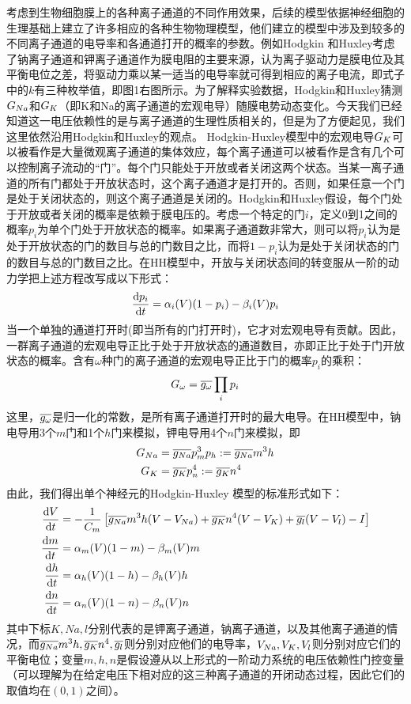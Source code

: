 \documentclass[
pdflinks,
]{xjtuthesis}
\begin{document}
考虑到生物细胞膜上的各种离子通道的不同作用效果，后续的模型依据神经细胞的生理基础上建立了许多相应的各种生物物理模型，他们建立的模型中涉及到较多的不同离子通道的电导率和各通道打开的概率的参数。例如Hodgkin 和Huxley考虑了钠离子通道和钾离子通道作为膜电阻的主要来源，认为离子驱动力是膜电位及其平衡电位之差，将驱动力乘以某一适当的电导率就可得到相应的离子电流，即式子中的$k$有三种枚举值，即图1右图所示。为了解释实验数据，Hodgkin和Huxley猜测$G_{Na}$和$G_{K}$（即K和Na的离子通道的宏观电导）随膜电势动态变化。今天我们已经知道这一电压依赖性的是与离子通道的生理性质相关的，但是为了方便起见，我们这里依然沿用Hodgkin和Huxley的观点。 Hodgkin-Huxley模型中的宏观电导$G_{K}$可以被看作是大量微观离子通道的集体效应，每个离子通道可以被看作是含有几个可以控制离子流动的“门”。每个门只能处于开放或者关闭这两个状态。当某一离子通道的所有门都处于开放状态时，这个离子通道才是打开的。否则，如果任意一个门是处于关闭状态的，则这个离子通道是关闭的。Hodgkin和Huxley假设，每个门处于开放或者关闭的概率是依赖于膜电压的。考虑一个特定的门$i$，定义0到1之间的概率$p_i$为单个门处于开放状态的概率。如果离子通道数非常大，则可以将$p_i$认为是处于开放状态的门的数目与总的门数目之比，而将$1-p_i$认为是处于关闭状态的门的数目与总的门数目之比。在HH模型中，开放与关闭状态间的转变服从一阶的动力学把上述方程改写成以下形式：
\begin{align}
\frac{\mathrm d p_i}{\mathrm d t}= \alpha_i (V)(1-p_i)-\beta_i (V)p_i
\end{align}
当一个单独的通道打开时(即当所有的门打开时)，它才对宏观电导有贡献。因此，一群离子通道的宏观电导正比于处于开放状态的通道数目，亦即正比于处于门开放状态的概率。含有$\omega$种门的离子通道的宏观电导正比于门的概率$p_i$的乘积：
\begin{align}
G_{\omega} = \overline{g_{\omega}} \prod_i p_i
\end{align}
这里，$\overline{g_{\omega}}$是归一化的常数，是所有离子通道打开时的最大电导。在HH模型中，钠电导用3个$m$门和1个$h$门来模拟，钾电导用4个$n$门来模拟，即
\begin{align}
G_{Na} &= \overline{g_{Na}} p_m^3p_h:= \overline{g_{Na}} m^3h\\
G_{K} &= \overline{g_{K}} p_n^4:= \overline{g_{K}} n^4
\end{align}
由此，我们得出单个神经元的Hodgkin-Huxley 模型的标准形式如下：
\begin{align}
\notag \frac{\mathrm d V}{\mathrm d t} &= - \dfrac{1}{C_m} \left[ \overline{g_{Na}} m^3h(V-V_{Na})+ \overline{g_{K}} n^4(V-V_{K})+\overline{g_l}(V-V_{l}) - I \right] \\
\frac{\mathrm d m}{\mathrm d t} &= \alpha_m (V)(1-m)-\beta_m (V)m \\
\notag \frac{\mathrm d h}{\mathrm d t} &= \alpha_h (V)(1-h)-\beta_h (V)h \\
\notag \frac{\mathrm d n}{\mathrm d t} &= \alpha_n (V)(1-n)-\beta_n (V)n 
\end{align}
其中下标$K,Na,l$分别代表的是钾离子通道，钠离子通道，以及其他离子通道的情况，而$\overline{g_{Na}} m^3h,\overline{g_{K}} n^4, \overline{g_l}$则分别对应他们的电导率，$V_{Na}, V_{K}, V_{l}$则分别对应它们的平衡电位；变量$m,h,n$是假设遵从以上形式的一阶动力系统的电压依赖性门控变量（可以理解为在给定电压下相对应的这三种离子通道的开闭动态过程，因此它们的取值均在$(0,1)$之间）。
\end{document}
